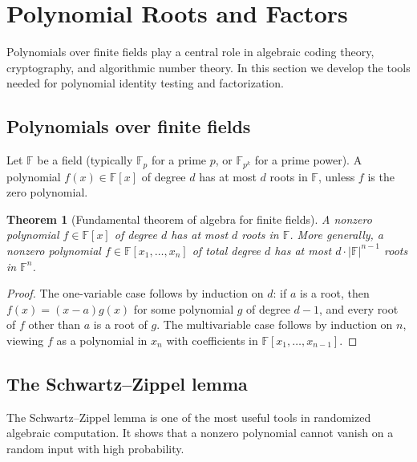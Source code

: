 \documentclass[twoside,12pt]{book}
\theoremstyle{plain}
\newtheorem{theorem}{Theorem}[chapter]
\theoremstyle{definition}
\theoremstyle{remark}
\begin{document}
\section{Polynomial Roots and Factors}
\label{sec:poly-roots}

Polynomials over finite fields play a central role in algebraic coding theory, cryptography, and algorithmic number theory. In this section we develop the tools needed for polynomial identity testing and factorization.

\subsection{Polynomials over finite fields}

Let $\mathbb{F}$ be a field (typically $\mathbb{F}_p$ for a prime $p$, or $\mathbb{F}_{p^k}$ for a prime power). A polynomial $f(x) \in \mathbb{F}[x]$ of degree $d$ has at most $d$ roots in $\mathbb{F}$, unless $f$ is the zero polynomial.

\begin{theorem}[Fundamental theorem of algebra for finite fields]
\label{thm:poly-roots-bounded}
A nonzero polynomial $f \in \mathbb{F}[x]$ of degree $d$ has at most $d$ roots in $\mathbb{F}$. More generally, a nonzero polynomial $f \in \mathbb{F}[x_1, \ldots, x_n]$ of total degree $d$ has at most $d \cdot |\mathbb{F}|^{n-1}$ roots in $\mathbb{F}^n$.
\end{theorem}

\begin{proof}
The one-variable case follows by induction on $d$: if $a$ is a root, then $f(x) = (x - a) g(x)$ for some polynomial $g$ of degree $d-1$, and every root of $f$ other than $a$ is a root of $g$. The multivariable case follows by induction on $n$, viewing $f$ as a polynomial in $x_n$ with coefficients in $\mathbb{F}[x_1, \ldots, x_{n-1}]$.
\end{proof}

\subsection{The Schwartz--Zippel lemma}

The Schwartz--Zippel lemma is one of the most useful tools in randomized algebraic computation. It shows that a nonzero polynomial cannot vanish on a random input with high probability.
\end{document}
